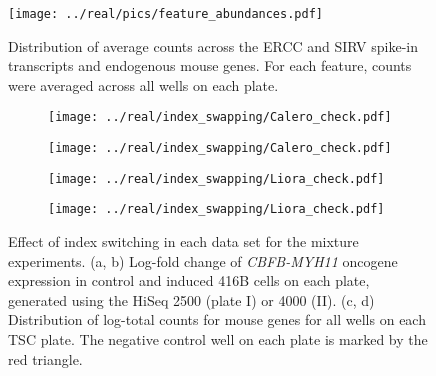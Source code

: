 \documentclass{article}
\begin{document}
\begin{figure}[btp]
    \begin{center}
        \texttt{[image: ../real/pics/feature\_abundances.pdf]}
    \end{center}
    \caption{Distribution of average counts across the ERCC and SIRV spike-in transcripts and endogenous mouse genes.
    For each feature, counts were averaged across all wells on each plate.}
\end{figure}

\begin{figure}[btp]
    \begin{center}
        \begin{subfigure}{0.49\textwidth}
            \texttt{[image: ../real/index\_swapping/Calero\_check.pdf]}
            \caption{}
        \end{subfigure}
        \begin{subfigure}{0.49\textwidth}
            \texttt{[image: ../real/index\_swapping/Calero\_check.pdf]}
            \caption{}
        \end{subfigure}
        \begin{subfigure}{0.49\textwidth}
            \texttt{[image: ../real/index\_swapping/Liora\_check.pdf]}
            \caption{}
        \end{subfigure}
        \begin{subfigure}{0.49\textwidth}
            \texttt{[image: ../real/index\_swapping/Liora\_check.pdf]}
            \caption{}
        \end{subfigure}
    \end{center}
    \caption{Effect of index switching in each data set for the mixture experiments.
        (a, b) Log-fold change of \textit{CBFB-MYH11} oncogene expression in control and induced 416B cells on each plate, generated using the HiSeq 2500 (plate I) or 4000 (II).
        (c, d) Distribution of log-total counts for mouse genes for all wells on each TSC plate.
        The negative control well on each plate is marked by the red triangle.
    }
    \label{fig:switching}
\end{figure}
\end{document}

